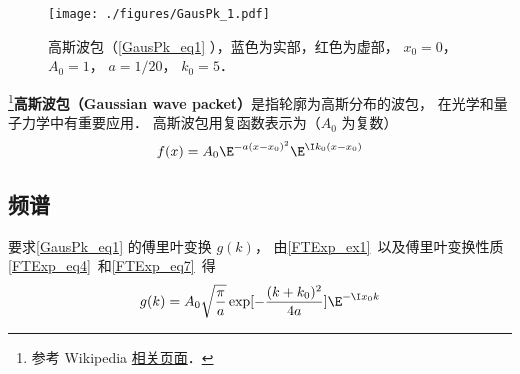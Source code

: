 
\begin{issues}
\issueDraft
\end{issues}


\begin{figure}[ht]
\centering
\texttt{[image: ./figures/GausPk\_1.pdf]}
\caption{高斯波包（\autoref{GausPk_eq1} ），蓝色为实部，红色为虚部， $x_0 = 0$， $A_0 = 1$， $a = 1/20$， $k_0 = 5$．} \label{GausPk_fig1}
\end{figure}

\footnote{参考 Wikipedia \href{https://en.wikipedia.org/wiki/Wave_packet}{相关页面}．}\textbf{高斯波包（Gaussian wave packet）}是指轮廓为高斯分布的波包， 在光学和量子力学中有重要应用． 高斯波包用复函数表示为（$A_0$ 为复数）
\begin{equation}\label{GausPk_eq1}
f(x) = A_0 \E^{-a(x-x_0)^2}\E^{\I k_0 (x-x_0)}
\end{equation}

\subsection{频谱}
要求\autoref{GausPk_eq1} 的傅里叶变换 $g(k)$， 由\autoref{FTExp_ex1}~以及傅里叶变换性质\autoref{FTExp_eq4}~和\autoref{FTExp_eq7}~得
\begin{equation}
g(k) = A_0\sqrt{\frac{\pi}{a}} \exp[-\frac{(k+k_0)^2}{4a}] \E^{-\I x_0 k}
\end{equation}
